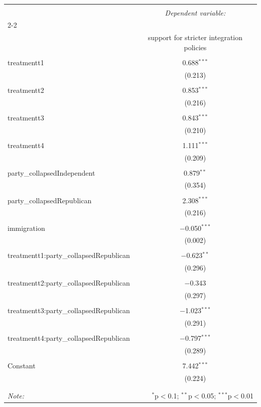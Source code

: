 \documentclass[12pt,letterpaper]{article}
\begin{document}
		\begin{table}[!htbp] \centering 
			\caption{} 
			\label{} 
			\begin{tabular}{@{\extracolsep{5pt}}lc} 
				\\[-1.8ex]\hline 
				\hline \\[-1.8ex] 
				& \multicolumn{1}{c}{\textit{Dependent variable:}} \\ 
				\cline{2-2} 
				\\[-1.8ex] & support for stricter integration policies \\ 
				\hline \\[-1.8ex] 
				treatmentt1 & 0.688$^{***}$ \\ 
				& (0.213) \\ 
				& \\ 
				treatmentt2 & 0.853$^{***}$ \\ 
				& (0.216) \\ 
				& \\ 
				treatmentt3 & 0.843$^{***}$ \\ 
				& (0.210) \\ 
				& \\ 
				treatmentt4 & 1.111$^{***}$ \\ 
				& (0.209) \\ 
				& \\ 
				party\_collapsedIndependent & 0.879$^{**}$ \\ 
				& (0.354) \\ 
				& \\ 
				party\_collapsedRepublican & 2.308$^{***}$ \\ 
				& (0.216) \\ 
				& \\ 
				immigration & $-$0.050$^{***}$ \\ 
				& (0.002) \\ 
				& \\ 
				treatmentt1:party\_collapsedRepublican & $-$0.623$^{**}$ \\ 
				& (0.296) \\ 
				& \\ 
				treatmentt2:party\_collapsedRepublican & $-$0.343 \\ 
				& (0.297) \\ 
				& \\ 
				treatmentt3:party\_collapsedRepublican & $-$1.023$^{***}$ \\ 
				& (0.291) \\ 
				& \\ 
				treatmentt4:party\_collapsedRepublican & $-$0.797$^{***}$ \\ 
				& (0.289) \\ 
				& \\ 
				Constant & 7.442$^{***}$ \\ 
				& (0.224) \\ 
				& \\ 
				\hline \\[-1.8ex] 
				\textit{Note:}  & \multicolumn{1}{r}{$^{*}$p$<$0.1; $^{**}$p$<$0.05; $^{***}$p$<$0.01} \\ 
			\end{tabular} 
		\end{table} 
\end{document}
